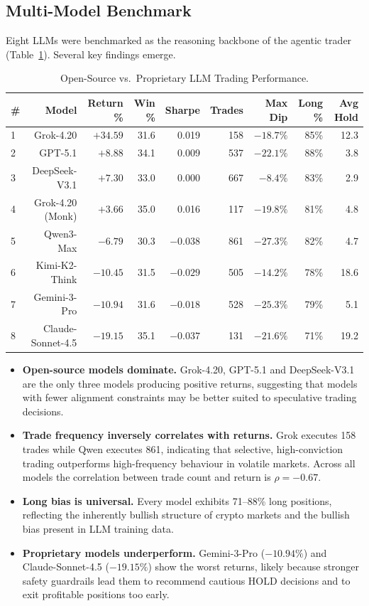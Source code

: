 \documentclass[12pt,a4paper,oneside,openany]{book}
\begin{document}
\begin{itemize}[leftmargin=8mm]
\subsection{Multi-Model Benchmark}
Eight LLMs were benchmarked as the reasoning backbone of the agentic trader (Table~\ref{tab:bench}). Several key findings emerge.

\begin{table}[H]
\centering
\caption{Open-Source vs.\ Proprietary LLM Trading Performance.}
\label{tab:bench}
\small
\begin{tabular}{@{}lrrrrrrrr@{}}
\toprule
\textbf{\#} & \textbf{Model} & \textbf{Return \%} & \textbf{Win \%} & \textbf{Sharpe} & \textbf{Trades} & \textbf{Max Dip} & \textbf{Long \%} & \textbf{Avg Hold} \\
\midrule
1 & Grok-4.20          & $+34.59$  & 31.6 & 0.019  & 158 & $-18.7\%$ & 85\% & 12.3 \\
2 & GPT-5.1            & $+8.88$   & 34.1 & 0.009  & 537 & $-22.1\%$ & 88\% & 3.8  \\
3 & DeepSeek-V3.1      & $+7.30$   & 33.0 & 0.000  & 667 & $-8.4\%$  & 83\% & 2.9  \\
4 & Grok-4.20 (Monk)   & $+3.66$   & 35.0 & 0.016  & 117 & $-19.8\%$ & 81\% & 4.8  \\
5 & Qwen3-Max          & $-6.79$   & 30.3 & $-0.038$ & 861 & $-27.3\%$ & 82\% & 4.7  \\
6 & Kimi-K2-Think      & $-10.45$  & 31.5 & $-0.029$ & 505 & $-14.2\%$ & 78\% & 18.6 \\
7 & Gemini-3-Pro       & $-10.94$  & 31.6 & $-0.018$ & 528 & $-25.3\%$ & 79\% & 5.1  \\
8 & Claude-Sonnet-4.5  & $-19.15$  & 35.1 & $-0.037$ & 131 & $-21.6\%$ & 71\% & 19.2 \\
\bottomrule
\end{tabular}
\end{table}

\begin{itemize}[leftmargin=8mm]
\item \textbf{Open-source models dominate.} Grok-4.20, GPT-5.1 and DeepSeek-V3.1 are the only three models producing positive returns, suggesting that models with fewer alignment constraints may be better suited to speculative trading decisions.
\item \textbf{Trade frequency inversely correlates with returns.} Grok executes 158 trades while Qwen executes 861, indicating that selective, high-conviction trading outperforms high-frequency behaviour in volatile markets. Across all models the correlation between trade count and return is $\rho = -0.67$.
\item \textbf{Long bias is universal.} Every model exhibits 71--88\% long positions, reflecting the inherently bullish structure of crypto markets and the bullish bias present in LLM training data.
\item \textbf{Proprietary models underperform.} Gemini-3-Pro ($-10.94\%$) and Claude-Sonnet-4.5 ($-19.15\%$) show the worst returns, likely because stronger safety guardrails lead them to recommend cautious HOLD decisions and to exit profitable positions too early.
\end{itemize}


\end{itemize}
\end{document}
